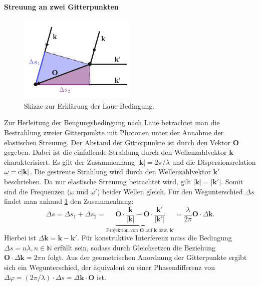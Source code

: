 \paragraph{Streuung an zwei Gitterpunkten}
\begin{figure}
    \centering
    \includegraphics[width=0.5\textwidth]{../assets/theorie/lauebeugung}
    \caption{Skizze zur Erklärung der Laue-Bedingung. } \label{fig:laue}
\end{figure}
Zur Herleitung der Beugungsbedingung nach Laue betrachtet man die Bestrahlung zweier Gitterpunkte mit Photonen unter
der Annahme der elastischen Streuung.
Der Abstand der Gitterpunkte ist durch den Vektor $\mathbf{O}$ gegeben.
Dabei ist die einfallende Strahlung durch den Wellenzahlvektor  $\mathbf{k}$ charakterisiert.
Es gilt der Zusammenhang $\lvert \mathbf{k} \rvert = 2 \pi / \lambda$ und die Dispersionsrelation
$\omega = \mathrm{c} \lvert \mathbf{k} \rvert$.
Die gestreute Strahlung wird durch den Wellenzahlvektor $\mathbf{k}'$ beschrieben.
Da nur elastische Streuung betrachtet wird, gilt $\lvert \mathbf{k} \rvert=\lvert \mathbf{k}' \rvert$.
Somit sind die Frequenzen ($\omega$ und $\omega'$) beider Wellen gleich.
Für den Wegunterschied $\Delta s$ findet man anhand \cref{fig:laue} den Zusammenhang:
\begin{equation}
    \Delta s = \Delta s_{1} + \Delta s_{2} = \underbrace{ \mathbf{O} \cdot \frac{\mathbf{k}}{\lvert \mathbf{k} \rvert }
    -\mathbf{O}\cdot \frac{\mathbf{k}'}{\lvert \mathbf{k}' \rvert}  }_{ \text{Projektion von } \mathbf{O} \text{ auf }
    \mathbf{k} \text{ bzw. }\mathbf{k'} } =  \frac{\lambda}{2\pi} \mathbf{O}\cdot\Delta \mathbf{k}.
    \label{eq:laue}
\end{equation}
Hierbei ist $\Delta \mathbf{k} = \mathbf{k}-\mathbf{k}'$.
Für konstruktive Interferenz muss die Bedingung $\Delta s = n \lambda, n \in \mathbb{N}$ erfüllt sein, sodass durch Gleichsetzen
die Beziehung $\mathbf{O}\cdot\Delta \mathbf{k} =2\pi n$ folgt.
Aus der geometrischen Anordnung der Gitterpunkte ergibt sich ein Wegunterschied, der äquivalent
zu einer Phasendifferenz von $\Delta\varphi=(2\pi / \lambda) \cdot \Delta s = \Delta \mathbf{k}\cdot \mathbf{O}$ ist.
\autocite[122-123]{Ashcroft}

